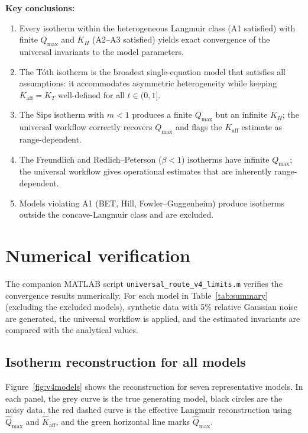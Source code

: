 \documentclass[12pt]{article}
\begin{document}
\textbf{Key conclusions:}
\begin{enumerate}[nosep]
  \item Every isotherm within the heterogeneous Langmuir class
        (A1 satisfied) with finite $Q_{\max}$ and $K_H$
        (A2--A3 satisfied) yields exact convergence of the
        universal invariants to the model parameters.
  \item The T\'oth isotherm is the broadest single-equation model
        that satisfies all assumptions: it accommodates asymmetric
        heterogeneity while keeping $K_{\mathrm{aff}}=K_T$
        well-defined for all $t\in(0,1]$.
  \item The Sips isotherm with $m<1$ produces a finite
        $Q_{\max}$ but an infinite $K_H$; the universal workflow
        correctly recovers $Q_{\max}$ and flags the
        $K_{\mathrm{aff}}$ estimate as range-dependent.
  \item The Freundlich and Redlich--Peterson ($\beta<1$) isotherms
        have infinite $Q_{\max}$; the universal workflow gives
        operational estimates that are inherently range-dependent.
  \item Models violating A1 (BET, Hill, Fowler--Guggenheim) produce
        isotherms outside the concave-Langmuir class and are
        excluded.
\end{enumerate}

\section{Numerical verification}
\label{sec:numerical}

The companion MATLAB script
\texttt{universal\_route\_v4\_limits.m} verifies the
convergence results numerically.  For each model in
Table~\ref{tab:summary} (excluding the excluded models), synthetic
data with 5\% relative Gaussian noise are generated, the universal
workflow is applied, and the estimated invariants are compared with
the analytical values.

\subsection{Isotherm reconstruction for all models}

Figure~\ref{fig:v4models} shows the reconstruction for seven
representative models.  In each panel, the grey curve is the true
generating model, black circles are the noisy data, the red dashed
curve is the effective Langmuir reconstruction using
$\widehat{Q}_{\max}$ and $\widehat{K}_{\mathrm{aff}}$, and the
green horizontal line marks $\widehat{Q}_{\max}$.
\end{document}
